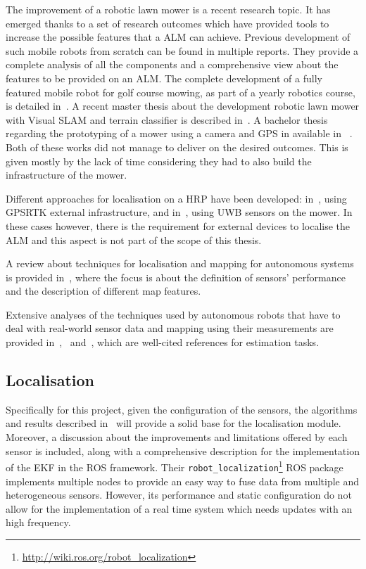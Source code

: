 \noindent
The improvement of a robotic lawn mower is a recent research topic. It has emerged thanks to a set of research outcomes which have provided tools to increase the possible features that a \gls{ALM} can achieve.
Previous development of such mobile robots from scratch can be found in multiple reports.
They provide a complete analysis of all the components and a comprehensive view about the features to be provided on an \gls{ALM}.
The complete development of a fully featured mobile robot for golf course mowing, as part of a yearly robotics course, is detailed in~\cite{noauthor_groundsbot_nodate}.
A recent master thesis about the development robotic lawn mower with Visual SLAM and terrain classifier is described in~\cite{lukas_robotic_2020}.
A bachelor thesis regarding the prototyping of a mower using a camera and GPS in available in~ \cite{andersson_smart_2018}.
Both of these works did not manage to deliver on the desired outcomes. This is given mostly by the lack of time considering they had to also build the infrastructure of the mower.

Different approaches for localisation on a \gls{HRP} have been developed: in~\cite{oden_localization_2017}, using \gls{GPSRTK} external infrastructure, and in~\cite{lensund_local_2018}, using \gls{UWB} sensors on the mower.
In these cases however, there is the requirement for external devices to localise the \gls{ALM} and this aspect is not part of the scope of this thesis.


A review about techniques for localisation and mapping for autonomous systems is provided in~\cite{9065135}, where the focus is about the definition of sensors' performance and the description of different map features.

Extensive analyses of the techniques used by autonomous robots that have to deal with real-world sensor data and mapping using their measurements are provided in~\cite{thrun_probabilistic_2005},~\cite{gustafsson_statistical_2010} and~\cite{mitchell2007multi}, which are well-cited references for estimation tasks.

\subsection{Localisation}

Specifically for this project, given the configuration of the sensors, the algorithms and results described in~\cite{moore_generalized_2016} will provide a solid base for the localisation module.
Moreover, a discussion about the improvements and limitations offered by each sensor is included, along with a comprehensive description for the implementation of the \gls{EKF} in the \gls{ROS} framework.
Their \texttt{robot\_localization}\footnote{\url{http://wiki.ros.org/robot_localization}} ROS package implements multiple nodes to provide an easy way to fuse data from multiple and heterogeneous sensors.
However, its performance and static configuration do not allow for the implementation of a real time system which needs updates with an high frequency.

